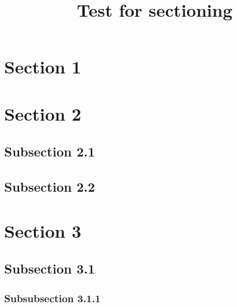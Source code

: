 \usepackage{lipsum}

\title{Test for sectioning}
\author{}
\date{}

\usepackage{calc}
\usepackage{longtable}
\usepackage{tabu}
\usepackage{breqn}
\setlength{\arraycolsep}{0.800000em}
\renewcommand{\arraystretch}{1.400000}

\renewcommand{\baselinestretch}{1.250000}
\selectfont
\setlength{\parskip}{1.0\baselineskip}


\maketitle
\tableofcontents



\lipsum[1-1]

\section{Section 1}

\lipsum[2-3]

\section{Section 2}

\subsection{Subsection 2.1}

\lipsum[4-6]

\subsection{Subsection 2.2}

\lipsum[7-9]

\section{Section 3}

\lipsum[10-12]

\subsection{Subsection 3.1}

\subsubsection{Subsubsection 3.1.1}

